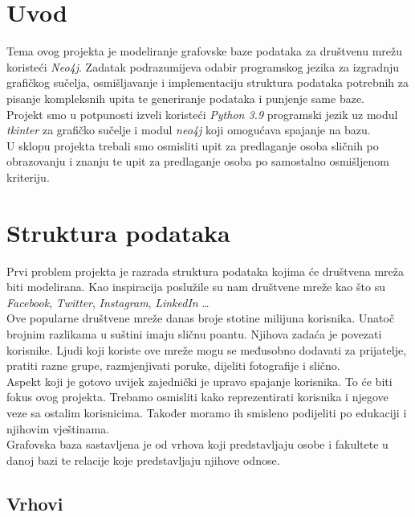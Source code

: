 \documentclass[titlepage, 12pt]{scrartcl}
\begin{document}
	\tableofcontents
	
	\newpage
	
	\section{Uvod}
	
	Tema ovog projekta je modeliranje grafovske baze podataka za društvenu mrežu koristeći \emph{Neo4j}. Zadatak podrazumijeva odabir programskog jezika za izgradnju grafičkog sučelja, osmišljavanje i implementaciju struktura podataka potrebnih za pisanje kompleksnih upita te generiranje podataka i punjenje same baze. \\
	Projekt smo u potpunosti izveli koristeći \emph{Python 3.9} programski jezik uz modul \emph{tkinter} za grafičko sučelje i modul \emph{neo4j} koji omogućava spajanje na bazu. \\
	U sklopu projekta trebali smo osmisliti upit za predlaganje osoba sličnih po obrazovanju i znanju te upit za predlaganje osoba po samostalno osmišljenom kriteriju.
	
	\newpage
	\section{Struktura podataka}
	Prvi problem projekta je razrada struktura podataka kojima će društvena mreža biti modelirana. Kao inspiracija poslužile su nam društvene mreže kao što su \emph{Facebook}, \emph{Twitter}, \emph{Instagram}, \emph{LinkedIn} \dots \\
	Ove popularne društvene mreže danas broje stotine milijuna korisnika. Unatoč brojnim razlikama u suštini imaju sličnu poantu. Njihova zadaća je povezati korisnike. Ljudi koji koriste ove mreže mogu se međusobno dodavati za prijatelje, pratiti razne grupe, razmjenjivati poruke, dijeliti fotografije i slično. \\
	Aspekt koji je gotovo uvijek zajednički je upravo spajanje korisnika. To će biti fokus ovog projekta. Trebamo osmisliti kako reprezentirati korisnika i njegove veze sa ostalim korisnicima. Također moramo ih smisleno podijeliti po edukaciji i njihovim vještinama. \\
	Grafovska baza sastavljena je od vrhova koji predstavljaju osobe i fakultete u danoj bazi te relacije koje predstavljaju njihove odnose.
	
	\subsection{Vrhovi}
\end{document}
